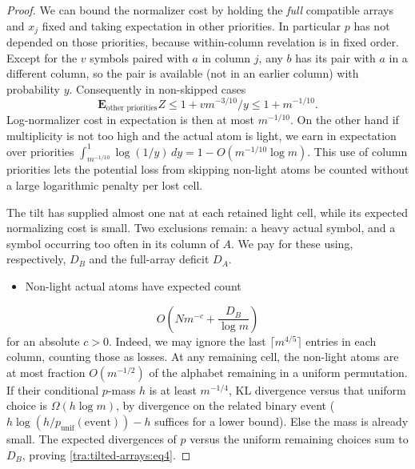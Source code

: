 \begin{proof}
We can bound the normalizer cost by holding the \emph{full} compatible arrays and \(x_j\) fixed and taking expectation in other priorities. In particular \(p\) has not depended on those priorities, because within-column revelation is in fixed order. Except for the \(v\) symbols paired with \(a\) in column \(j\), any \(b\) has its pair with \(a\) in a different column, so the pair is available (not in an earlier column) with probability \(y\). Consequently in non-skipped cases
\[
 \mathbf E_{\text{other priorities}} Z
 \le 1+v m^{-3/10}/y
 \le 1+m^{-1/10}.
\]
Log-normalizer cost in expectation is then at most \(m^{-1/10}\). On the other hand if multiplicity is not too high and the actual atom is light, we earn in expectation over priorities
\(\int_{m^{-1/10}}^1 \log(1/y)\,dy
=1-O(m^{-1/10}\log m)\).
This use of column priorities lets the potential loss from skipping non-light atoms be counted without a large logarithmic penalty per lost cell.

The tilt has supplied almost one nat at each retained light cell, while its expected normalizing cost is small. Two exclusions remain: a heavy actual symbol, and a symbol occurring too often in its column of $A$. We pay for these using, respectively, $D_B$ and the full-array deficit $D_A$.

\begin{itemize}
\item Non-light actual atoms have expected count
\end{itemize}
\begin{equation}
 O\left(N m^{-c}+\frac{D_B}{\log m}\right) \label{tra:tilted-arrays:eq4}
\end{equation}
for an absolute \(c>0\). Indeed, we may ignore the last \(\lceil m^{4/5}\rceil\) entries in each column, counting those as losses. At any remaining cell, the non-light atoms are at most fraction \(O(m^{-1/2})\) of the alphabet remaining in a uniform permutation. If their conditional \(p\)-mass \(h\) is at least \(m^{-1/4}\), KL divergence versus that uniform choice is \(\Omega(h\log m)\), by divergence on the related binary event (\(h\log(h/p_{\mathrm{unif}}(\mathrm{event}))-h\) suffices for a lower bound). Else the mass is already small. The expected divergences of \(p\) versus the uniform remaining choices sum to \(D_B\), proving \eqref{tra:tilted-arrays:eq4}.


\end{proof}
